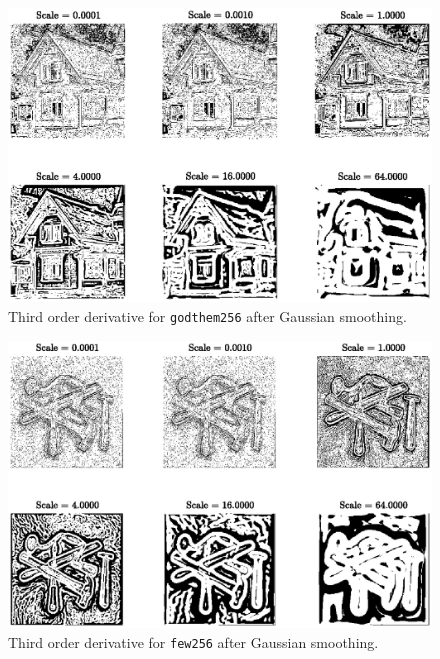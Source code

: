 \documentclass[11pt,a4paper]{article}
\begin{document}
	\begin{figure}[!ht]
		\centering
		\includegraphics[width=0.9\columnwidth]{Question_4_House_Third_Order.eps}
		\caption{Third order derivative for \texttt{godthem256} after Gaussian smoothing.}
		\label{fig:Question_4_House_Third_Order}
	\end{figure}
	\begin{figure}[!ht]
		\centering
		\includegraphics[width=0.9\columnwidth]{Question_4_Tools_Third_Order.eps}
		\caption{Third order derivative for \texttt{few256} after Gaussian smoothing.}
		\label{fig:Question_4_Tools_Third_Order}
	\end{figure}
\end{document}
